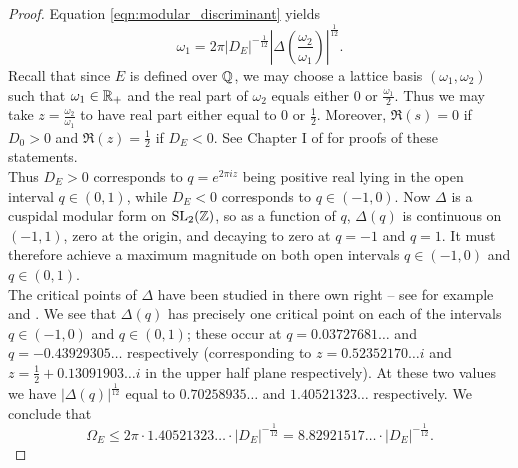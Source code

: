 \begin{proof}
Equation \ref{eqn:modular_discriminant} yields
\begin{equation}
\omega_1 = 2\pi |D_E|^{-\frac{1}{12}} \left| \Delta\left(\frac{\omega_2}{\omega_1}\right)\right|^{\frac{1}{12}}.
\end{equation}
Recall that since $E$ is defined over $\mathbb{Q}$, we may choose a lattice basis $(\omega_1, \omega_2)$ such that $\omega_1 \in \mathbb{R}_{+}$ and the real part of $\omega_2$ equals either $0$ or $\frac{\omega_1}{2}$. Thus we may take $z = \frac{\omega_2}{\omega_1}$ to have real part either equal to 0 or $\frac{1}{2}$. Moreover, $\Re(s)=0$ if $D_0>0$ and $\Re(z)=\frac{1}{2}$ if $D_E<0$. See Chapter I of \cite{Sil-1994} for proofs of these statements. \\

Thus $D_E>0$ corresponds to $q = e^{2\pi i z}$ being positive real lying in the open interval $q \in (0,1)$, while $D_E<0$ corresponds to $q \in (-1,0)$. Now $\Delta$ is a cuspidal modular form on $\operatorname{SL}_2(\mathbb{Z})$, so as a function of $q$, $\Delta(q)$ is continuous on $(-1,1)$, zero at the origin, and decaying to zero at $q=-1$ and $q=1$. It must therefore achieve a maximum magnitude on both open intervals $q \in (-1,0)$ and $q \in (0,1)$. \\

The critical points of $\Delta$ have been studied in there own right -- see for example \cite{IJA-2013} and \cite{WoYo-2013}. We see that $\Delta(q)$ has precisely one critical point on each of the intervals $q \in (-1,0)$ and $q \in (0,1)$; these occur at $q = 0.03727681\ldots$ and $q =-0.43929305\ldots$ respectively (corresponding to $z=0.52352170\ldots i$ and $z=\frac{1}{2}+0.13091903\ldots i$ in the upper half plane respectively). At these two values we have $|\Delta(q)|^{\frac{1}{12}}$ equal to $0.70258935\ldots$ and $1.40521323\ldots$ respectively. We conclude that
\begin{equation}
\Omega_E \le 2\pi\cdot 1.40521323\ldots \cdot  |D_E|^{-\frac{1}{12}} = 8.82921517\ldots \cdot |D_E|^{-\frac{1}{12}}.
\end{equation} 
\end{proof}

